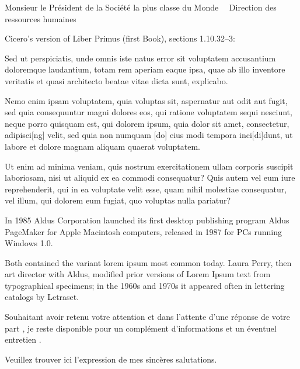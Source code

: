\documentclass{scrlttr2}
\renewcommand{\\}{~{\large\textperiodcentered}~}%
\begin{document}
\begin{letter}{ %
Monsieur le Président de
la Société la plus classe du Monde\\
Direction des ressources humaines\\

}
Cicero's version of Liber Primus (first Book), sections 1.10.32–3:\\

Sed ut perspiciatis, unde omnis iste natus error sit voluptatem accusantium doloremque laudantium, totam rem aperiam eaque ipsa, quae ab illo inventore veritatis et quasi architecto beatae vitae dicta sunt, explicabo.\\

Nemo enim ipsam voluptatem, quia voluptas sit, aspernatur aut odit aut fugit, sed quia consequuntur magni dolores eos, qui ratione voluptatem sequi nesciunt, neque porro quisquam est, qui dolorem ipsum, quia dolor sit amet, consectetur, adipisci[ng] velit, sed quia non numquam [do] eius modi tempora inci[di]dunt, ut labore et dolore magnam aliquam quaerat voluptatem.\\

Ut enim ad minima veniam, quis nostrum exercitationem ullam corporis suscipit laboriosam, nisi ut aliquid ex ea commodi consequatur? Quis autem vel eum iure reprehenderit, qui in ea voluptate velit esse, quam nihil molestiae consequatur, vel illum, qui dolorem eum fugiat, quo voluptas nulla pariatur?\\

In 1985 Aldus Corporation launched its first desktop publishing program Aldus PageMaker for Apple Macintosh computers, released in 1987 for PCs running Windows 1.0. \\

Both contained the variant lorem ipsum most common today. Laura Perry, then art director with Aldus, modified prior versions of Lorem Ipsum text from typographical specimens; in the 1960s and 1970s it appeared often in lettering catalogs by Letraset. \\


Souhaitant avoir retenu votre attention et dans l'attente d'une réponse de votre part , je reste disponible pour un complément d'informations et un éventuel entretien .

Veuillez trouver ici l'expression de mes sincères salutations.

\closing{}
\end{letter}
\end{document}
